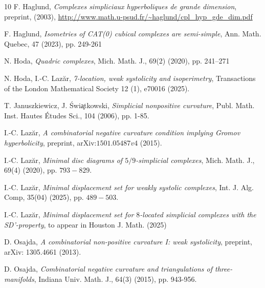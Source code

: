 \documentclass{amsart}
\theoremstyle{definition}
\theoremstyle{remark}
\numberwithin{equation}{section}
\begin{document}
\begin{thebibliography}{10}
F. Haglund,
\emph{Complexes simpliciaux hyperboliques de grande dimension},
preprint, (2003), \url{http://www.math.u-psud.fr/~haglund/cpl_hyp_gde_dim.pdf}


F. Haglund,
\emph{Isometries of CAT(0) cubical complexes are semi-simple},
 Ann. Math. Quebec, 47 (2023), pp. 249-261

N. Hoda, \emph{Quadric complexes}, Mich. Math. J., 69(2) (2020), pp. 241–271




N. Hoda, I.-C. Laz\u{a}r,
\emph{7-location, weak systolicity and isoperimetry},
Transactions of the London Mathematical Society 12 (1), e70016 (2025).


T. Januszkiewicz, J. {\'S}wi{\c{a}}tkowski,
\emph{Simplicial nonpositive curvature},
Publ. Math. Inst. Hautes \'Etudes Sci.,  104 (2006), pp. 1-85.




I.-C. Laz\u{a}r,
\emph{A combinatorial negative curvature condition implying Gromov hyperbolicity},
preprint, arXiv:$1501.05487v4$ (2015).


I.-C. Laz\u{a}r,
\emph{Minimal disc diagrams of $5/9$-simplicial complexes}, Mich. Math. J., 69(4) (2020), pp. $793-829$.



I.-C. Laz\u{a}r,
\emph{Minimal displacement set for weakly systolic complexes}, Int. J. Alg. Comp, 35(04) (2025), pp. $489-503$.


I.-C. Laz\u{a}r,
\emph{Minimal displacement set for $8$-located simplicial complexes with the SD'-property}, to appear in Houston J. Math.
 (2025)


D. Osajda,
\emph{A combinatorial non-positive curvature I: weak systolicity},
preprint, arXiv: 1305.4661 (2013).

D. Osajda,
\emph{Combinatorial negative curvature and triangulations of three-manifolds},
Indiana Univ. Math. J., 64(3) (2015), pp. 943-956.





\end{thebibliography}
\end{document}
